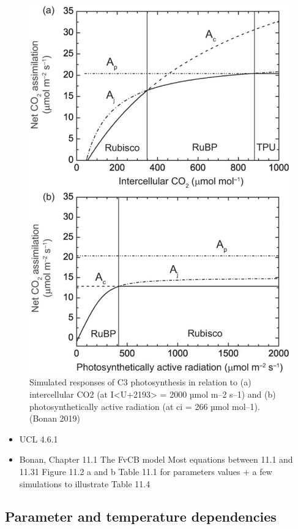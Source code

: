 \documentclass[
  oneside]{book}
\providecommand{\tightlist}{%
  \setlength{\itemsep}{0pt}\setlength{\parskip}{0pt}}
\begin{document}
\begin{figure}

{\centering \includegraphics[width=0.8\linewidth]{figures/chap2/simulated_responses} 

}

\caption{Simulated responses of C3 photosynthesis in relation to (a) intercellular CO2 (at I<U+2193> = 2000 µmol m–2 s–1) and (b) photosynthetically active radiation (at ci = 266 µmol mol–1). (Bonan 2019)}\label{fig:f28}
\end{figure}

\begin{itemize}
\tightlist
\item
  UCL 4.6.1
\item
  Bonan, Chapter 11.1
  The FvCB model
  Most equations between 11.1 and 11.31
  Figure 11.2 a and b
  Table 11.1 for parameters values + a few simulations to illustrate
  Table 11.4
\end{itemize}

\hypertarget{parameter-and-temperature-dependencies}{%
\subsection{Parameter and temperature dependencies}\label{parameter-and-temperature-dependencies}}
\end{document}
